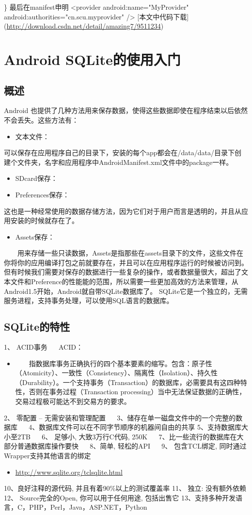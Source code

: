 \documentclass[9pt, b5paper]{article}
\begin{document}
\}  
最后在manifest申明
<provider android:name="MyProvider" android:authorities="cn.scu.myprovider" />
[本文中代码下载](\url{http://download.csdn.net/detail/amazing7/9511234})
\section{Android SQLite的使用入门}
\label{sec-15}
\subsection{概述}
\label{sec-15-1}
Android 也提供了几种方法用来保存数据，使得这些数据即使在程序结束以后依然不会丢失。这些方法有：　　　　　
\begin{itemize}
\item 文本文件：
\end{itemize}
可以保存在应用程序自己的目录下，安装的每个app都会在/data/data/目录下创建个文件夹，名字和应用程序中AndroidManifest.xml文件中的package一样。　　　
\begin{itemize}
\item SDcard保存：

\item Preferences保存：
\end{itemize}
这也是一种经常使用的数据存储方法，因为它们对于用户而言是透明的，并且从应用安装的时候就存在了。
\begin{itemize}
\item Assets保存：
\end{itemize}
 　　用来存储一些只读数据，Assets是指那些在assets目录下的文件，这些文件在你将你的应用编译打包之前就要存在，并且可以在应用程序运行的时候被访问到。
但有时候我们需要对保存的数据进行一些复杂的操作，或者数据量很大，超出了文本文件和Preference的性能能的范围，所以需要一些更加高效的方法来管理，从Android1.5开始，Android就自带SQLite数据库了。
SQLite它是一个独立的，无需服务进程，支持事务处理，可以使用SQL语言的数据库。
\subsection{SQLite的特性}
\label{sec-15-2}
 1、 ACID事务 　
ACID：
\begin{itemize}
\item 　　指数据库事务正确执行的四个基本要素的缩写。包含：原子性（Atomicity）、一致性（Consistency）、隔离性（Isolation）、持久性（Durability）。一个支持事务（Transaction）的数据库，必需要具有这四种特性，否则在事务过程（Transaction processing）当中无法保证数据的正确性，交易过程极可能达不到交易方的要求。
\end{itemize}
2、 零配置 – 无需安装和管理配置 　
3、储存在单一磁盘文件中的一个完整的数据库 　
4、数据库文件可以在不同字节顺序的机器间自由的共享 
5、支持数据库大小至2TB 　
6、 足够小, 大致3万行C代码, 250K 　
7、比一些流行的数据库在大部分普通数据库操作要快 　
8、简单, 轻松的API 　
9、 包含TCL绑定, 同时通过Wrapper支持其他语言的绑定 　
\begin{itemize}
\item \url{http://www.sqlite.org/tclsqlite.html}
\end{itemize}
10、良好注释的源代码, 并且有着90\%以上的测试覆盖率  
11、 独立: 没有额外依赖  
12、 Source完全的Open, 你可以用于任何用途, 包括出售它  
13、支持多种开发语言，C，PHP，Perl，Java，ASP.NET，Python 
\end{document}
